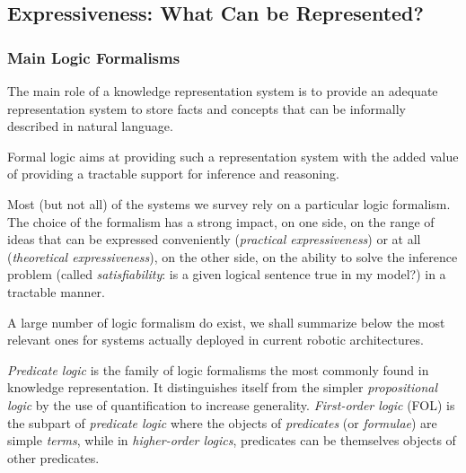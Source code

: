\documentclass[a4paper, twocolumn]{article}
\begin{document}
\subsection{Expressiveness: What Can be Represented?}
\label{sect|expressiveness}

\begin{scriptsize}
\begin{center}
\end{center}
\end{scriptsize}


\subsubsection{Main Logic Formalisms}

The main role of a knowledge representation system is to provide an adequate
representation system to store facts and concepts that can be informally
described in natural language.

Formal logic aims at providing such a representation system with the added
value of providing a tractable support for inference and reasoning.

Most (but not all) of the systems we survey rely on a particular logic
formalism. The choice of the formalism has a strong impact, on one side, on the
range of ideas that can be expressed conveniently (\emph{practical
expressiveness}) or at all (\emph{theoretical expressiveness}), on the other
side, on the ability to solve the inference problem (called
\emph{satisfiability}: is a given logical sentence true in my model?) in a
tractable manner.

A large number of logic formalism do exist, we shall summarize below the most
relevant ones for systems actually deployed in current robotic architectures.

\emph{Predicate logic} is the family of logic formalisms the most commonly
found in knowledge representation. It distinguishes itself from the simpler
\emph{propositional logic} by the use of quantification to increase generality.
\emph{First-order logic} (FOL) is the subpart of \emph{predicate logic} where the
objects of \emph{predicates} (or \emph{formulae}) are simple \emph{terms},
while in \emph{higher-order logics}, predicates can be themselves objects of
other predicates.
\end{document}
